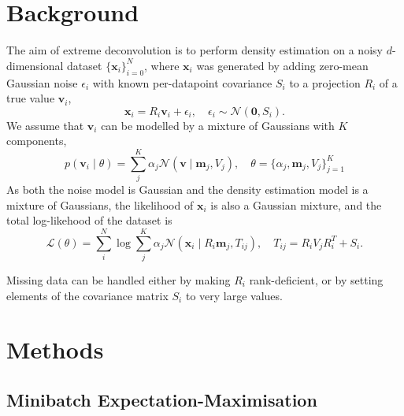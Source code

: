 \documentclass{article}
\newcommand{\bx}{\mathbf{x}}
\newcommand{\bv}{\mathbf{v}}
\newcommand{\bm}{\mathbf{m}}
\begin{document}
\section{Background}

The aim of extreme deconvolution is to perform density estimation on a noisy $d$-dimensional dataset $\{\bx_i\}_{i=0}^N$, where $\bx_i$ was generated by adding zero-mean Gaussian noise $\epsilon_i$ with known per-datapoint covariance $S_i$ to a projection $R_i$ of a true value $\bv_i$,
\begin{equation}
  \bx_i = R_i\bv_i + \epsilon_i,\quad  \epsilon_i \sim \mathcal{N}(\mathbf{0}, S_i).
\end{equation}
We assume that $\bv_i$ can be modelled by a mixture of Gaussians with $K$ components,
\begin{equation}
p(\bv_i \mid \theta) = \sum_j^K \alpha_j \mathcal{N}(\bv \mid \bm_j, V_j), \quad \theta = \{\alpha_j, \bm_j, V_j\}_{j=1} ^ K
\end{equation}
As both the noise model is Gaussian and the density estimation model is a mixture of Gaussians, the likelihood of $\bx_i$ is also a Gaussian mixture,
and the total log-likehood of the dataset is
\begin{equation}
\mathcal{L}(\theta) = \sum_i^N \log \sum_j^K \alpha_j\mathcal{N}(\bx_i \mid R_i\bm_j, T_{ij}), \quad T_{ij} = R_iV_jR_i^T + S_i.
\end{equation}

Missing data can be handled either by making $R_i$ rank-deficient, or by setting elements of the covariance matrix $S_i$ to very large values.

\section{Methods}

\subsection{Minibatch Expectation-Maximisation}
\end{document}
